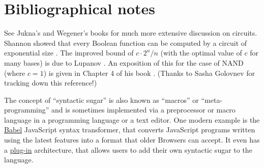 \hypertarget{thresholdcirc}{}

\section{Bibliographical notes}\label{computeeveryfunctionbibnotes}

See Jukna's and Wegener's books \cite{Jukna12, wegener1987complexity}
for much more extensive discussion on circuits. Shannon showed that
every Boolean function can be computed by a circuit of exponential size
\cite{Shannon1938}. The improved bound of \(c \cdot 2^n/n\) (with the
optimal value of \(c\) for many bases) is due to Lupanov
\cite{Lupanov1958}. An exposition of this for the case of NAND (where
\(c=1\)) is given in Chapter 4 of his book \cite{lupanov1984}. (Thanks
to Sasha Golovnev for tracking down this reference!)

The concept of ``syntactic sugar'' is also known as ``macros'' or
``meta-programming'' and is sometimes implemented via a preprocessor or
macro language in a programming language or a text editor. One modern
example is the \href{https://babeljs.io/}{Babel} JavaScript syntax
transformer, that converts JavaScript programs written using the latest
features into a format that older Browsers can accept. It even has a
\href{https://babeljs.io/docs/plugins/}{plug-in} architecture, that
allows users to add their own syntactic sugar to the language.
